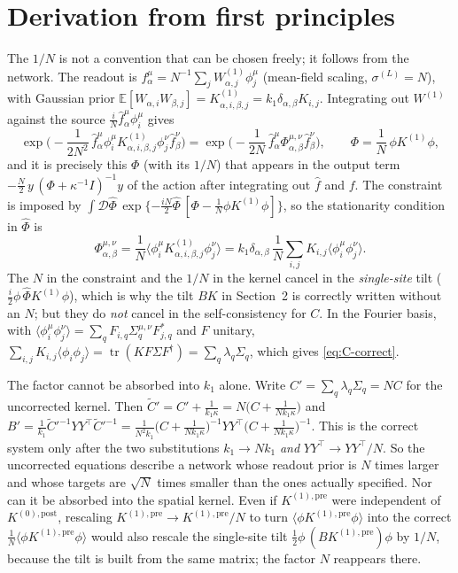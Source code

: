 \documentclass[11pt,a4paper]{article}
\newcommand{\E}{\mathbb E}
\begin{document}
\section{Derivation from first principles}
The $1/N$ is not a convention that can be chosen freely; it follows from the network.
The readout is $f^\mu_\alpha = N^{-1}\sum_j W^{(1)}_{\alpha,j}\phi^\mu_j$ (mean-field scaling, $\sigma^{(L)} = N$), with Gaussian prior
$\E[W_{\alpha,i} W_{\beta,j}] = K^{(1)}_{\alpha,i,\beta,j} = k_1 \delta_{\alpha,\beta} K_{i,j}$.
Integrating out $W^{(1)}$ against the source $\frac{i}{N}\hat f^\mu_\alpha \phi^\mu_i$ gives
\begin{equation}
  \exp\Big(-\frac{1}{2N^2}\,\hat f^\mu_\alpha \phi^\mu_i K^{(1)}_{\alpha,i,\beta,j}\phi^\nu_j \hat f^\nu_\beta\Big)
  = \exp\Big(-\frac{1}{2N}\,\hat f^\mu_\alpha \Phi^{\mu,\nu}_{\alpha,\beta}\hat f^\nu_\beta\Big),
  \qquad
  \Phi = \frac1N\, \phi K^{(1)} \phi ,
\end{equation}
and it is precisely this $\Phi$ (with its $1/N$) that appears in the output term
$-\frac N2\, y\,(\Phi + \kappa^{-1}I)^{-1} y$ of the action after integrating out $\hat f$ and $f$.
The constraint is imposed by
$\int \mathcal D\hat\Phi\, \exp\{-\tfrac{iN}{2}\hat\Phi\,[\Phi - \tfrac1N \phi K^{(1)}\phi]\}$, so the stationarity condition in $\hat\Phi$ is
\begin{equation}
  \Phi^{\mu,\nu}_{\alpha,\beta} = \frac1N \big\langle \phi^\mu_i K^{(1)}_{\alpha,i,\beta,j}\phi^\nu_j\big\rangle
  = k_1\delta_{\alpha,\beta}\,\frac1N \sum_{i,j}K_{i,j}\langle\phi^\mu_i\phi^\nu_j\rangle .
\end{equation}
The $N$ in the constraint and the $1/N$ in the kernel cancel in the \emph{single-site} tilt
($\frac{i}{2}\phi\,\hat\Phi K^{(1)}\phi$), which is why the tilt $B K$ in Section~2 is correctly written without an $N$;
but they do \emph{not} cancel in the self-consistency for $C$.
In the Fourier basis, with $\langle \phi^\mu_i\phi^\nu_j\rangle = \sum_q F_{i,q}\Sigma_q^{\mu,\nu}F^*_{j,q}$ and $F$ unitary,
$\sum_{i,j}K_{i,j}\langle\phi_i\phi_j\rangle = \operatorname{tr}(K F\Sigma F^\dagger) = \sum_q\lambda_q\Sigma_q$, which gives \eqref{eq:C-correct}.

The factor cannot be absorbed into $k_1$ alone. Write $C' = \sum_q\lambda_q\Sigma_q = NC$ for the uncorrected kernel. Then
$\tilde C' = C' + \frac{1}{k_1\kappa} = N\big(C + \frac{1}{Nk_1\kappa}\big)$ and
$B' = \frac{1}{k_1}\tilde C'^{-1}YY^\top\tilde C'^{-1} = \frac{1}{N^2k_1}\big(C+\frac{1}{Nk_1\kappa}\big)^{-1}YY^\top\big(C+\frac{1}{Nk_1\kappa}\big)^{-1}$.
This is the correct system only after the two substitutions $k_1 \to Nk_1$ \emph{and} $YY^\top \to YY^\top/N$.
So the uncorrected equations describe a network whose readout prior is $N$ times larger and whose targets are $\sqrt N$ times smaller than the ones actually specified.
Nor can it be absorbed into the spatial kernel. Even if $K^{(1),\text{pre}}$ were independent of $K^{(0),\text{post}}$, rescaling $K^{(1),\text{pre}} \to K^{(1),\text{pre}}/N$ to turn $\langle\phi K^{(1),\text{pre}}\phi\rangle$ into the correct $\frac1N\langle\phi K^{(1),\text{pre}}\phi\rangle$ would also rescale the single-site tilt $\frac12\phi\,(B K^{(1),\text{pre}})\phi$ by $1/N$, because the tilt is built from the same matrix; the factor $N$ reappears there.
\end{document}
